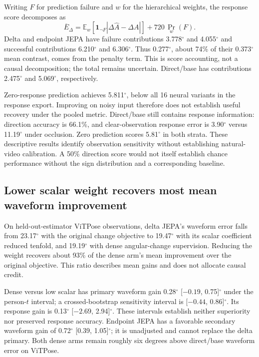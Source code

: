 \documentclass{article}
\newcommand{\degunit}{^{\circ}}
\begin{document}
Writing $F$ for prediction failure and $w$ for the hierarchical weights, the response score decomposes as
\begin{equation}
\overline E_\Delta=\mathbb E_w[\mathbf1_{\neg F}|\Delta\widehat A-\Delta A|]+720\,\Pr_w(F).
\label{eq:failure}
\end{equation}
Delta and endpoint JEPA have failure contributions 3.778$\degunit$ and 4.055$\degunit$ and successful contributions 6.210$\degunit$ and 6.306$\degunit$. Thus 0.277$\degunit$, about 74\% of their 0.373$\degunit$ mean contrast, comes from the penalty term. This is score accounting, not a causal decomposition; the total remains uncertain. Direct/base has contributions 2.475$\degunit$ and 5.069$\degunit$, respectively.

Zero-response prediction achieves 5.811$\degunit$, below all 16 neural variants in the response export. Improving on noisy input therefore does not establish useful recovery under the pooled metric. Direct/base still contains response information: direction accuracy is 66.1\%, and clear-observation response error is 3.90$\degunit$ versus 11.19$\degunit$ under occlusion. Zero prediction scores 5.81$\degunit$ in both strata. These descriptive results identify observation sensitivity without establishing natural-video calibration. A 50\% direction score would not itself establish chance performance without the sign distribution and a corresponding baseline.

\clearpage
\subsection{Lower scalar weight recovers most mean waveform improvement}
On held-out-estimator ViTPose observations, delta JEPA's waveform error falls from 23.17$\degunit$ with the original change objective to 19.47$\degunit$ with its scalar coefficient reduced tenfold, and 19.19$\degunit$ with dense angular-change supervision. Reducing the weight recovers about 93\% of the dense arm's mean improvement over the original objective. This ratio describes mean gains and does not allocate causal credit.



Dense versus low scalar has primary waveform gain 0.28$\degunit$ [${-0.19}$, 0.75]$\degunit$ under the person-$t$ interval; a crossed-bootstrap sensitivity interval is [${-0.44}$, 0.86]$\degunit$. Its response gain is 0.13$\degunit$ [${-2.69}$, 2.94]$\degunit$. These intervals establish neither superiority nor preserved response accuracy. Endpoint JEPA has a favorable secondary waveform gain of 0.72$\degunit$ [0.39, 1.05]$\degunit$; it is unadjusted and cannot replace the delta primary. Both dense arms remain roughly six degrees above direct/base waveform error on ViTPose.
\end{document}
